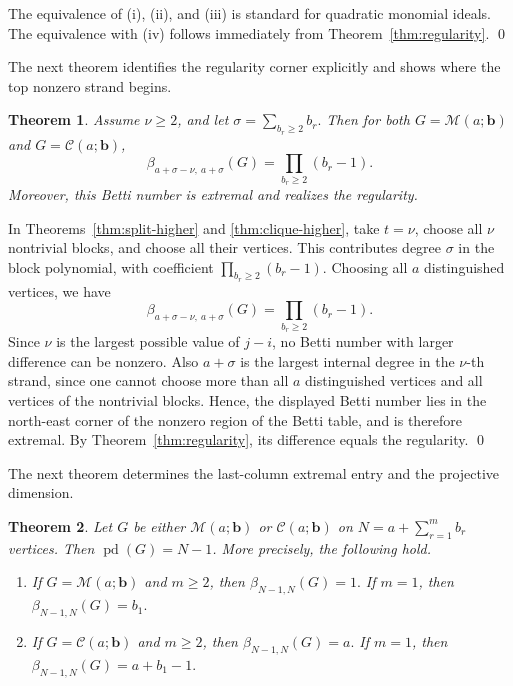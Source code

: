 \documentclass[12pt]{article}
\renewenvironment{proof}{{\bf \noindent Proof.}}{\qed}
\newtheorem{theorem}{Theorem}[section]
\theoremstyle{definition}
\theoremstyle{remark}
\DeclareMathOperator{\pd}{pd}
\newcommand{\MM}{\mathcal{M}}
\newcommand{\CC}{\mathcal{C}}
\newcommand{\bk}[1]{\mathbf{#1}}
\begin{document}
	\begin{proof}
		The equivalence of (i), (ii), and (iii) is standard for quadratic monomial ideals. The equivalence with (iv) follows immediately from Theorem~\ref{thm:regularity}.
	\end{proof}
	
	 \medskip The next theorem identifies the regularity corner explicitly and shows where the top nonzero strand begins.
	
	\begin{theorem}\label{thm:reg-corner}
		Assume $\nu\geq 2$, and let $ \sigma=\sum_{b_r\geq 2} b_r. $
		Then for both $G=\MM(a;\bk{b})$ and $G=\CC(a;\bk{b})$,
		$$
		\beta_{a+\sigma-\nu,\ a+\sigma}(G)=\prod_{b_r\geq 2}(b_r-1).
		$$
		Moreover, this Betti number is extremal and realizes the regularity.
	\end{theorem}
	
	\begin{proof}
		In Theorems~\ref{thm:split-higher} and \ref{thm:clique-higher}, take $t=\nu$, choose all $\nu$ nontrivial blocks, and choose all their vertices. This contributes degree $\sigma$ in the block polynomial, with coefficient $\prod_{b_r\geq 2}(b_r-1)$. Choosing all $a$ distinguished vertices, we have
		$$
		\beta_{a+\sigma-\nu,\ a+\sigma}(G)=\prod_{b_r\geq 2}(b_r-1).
		$$
		Since $\nu$ is the largest possible value of $j-i$, no Betti number with larger difference can be nonzero. Also $a+\sigma$ is the largest internal degree in the $\nu$-th strand, since one cannot choose more than all $a$ distinguished vertices and all vertices of the nontrivial blocks. Hence, the displayed Betti number lies in the north-east corner of the nonzero region of the Betti table, and is therefore extremal. By Theorem~\ref{thm:regularity}, its difference equals the regularity.
	\end{proof}
	
	 \medskip The next theorem determines the last-column extremal entry and the projective dimension.
	
	\begin{theorem}\label{thm:pd-last}
		Let $G$ be either $\MM(a;\bk{b})$ or $\CC(a;\bk{b})$ on $N=a+\sum_{r=1}^m b_r$ vertices. Then $\pd(G)=N-1$. More precisely, the following hold.
		
		\begin{enumerate}[label=\textup{(\roman*)}]
			\item If $G=\MM(a;\bk{b})$ and $m\geq 2$, then $ \beta_{N-1,N}(G)=1. $
			If $m=1$, then $ \beta_{N-1,N}(G)=b_1. $
			
			\item If $G=\CC(a;\bk{b})$ and $m\geq 2$, then $ \beta_{N-1,N}(G)=a. $
			If $m=1$, then 	$ \beta_{N-1,N}(G)=a+b_1-1. $
		\end{enumerate}
	\end{theorem}
	
\end{document}
